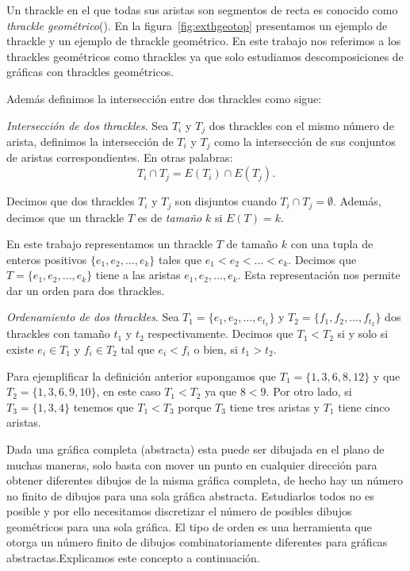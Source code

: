 Un thrackle en el que todas sus aristas son segmentos de recta es conocido como
\emph{thrackle geométrico}(\cite{Schaefer2018}). En la
figura~\ref{fig:exthgeotop} presentamos un ejemplo de thrackle y un ejemplo de
thrackle geométrico. En este trabajo nos referimos a los thrackles geométricos
como thrackles ya que solo estudiamos descomposiciones de gráficas con
thrackles geométricos.

Además definimos la intersección entre dos thrackles como sigue:

\begin{definition}{\emph{Intersección de dos thrackles}.} Sea $T_i$ y $T_j$ dos
  thrackles con el mismo número de arista, definimos la intersección de $T_i$ y
  $T_j$ como la intersección de sus conjuntos de aristas correspondientes. En
  otras palabras:
  \[ T_i \cap T_j = E(T_i) \cap E(T_j).\]
\end{definition}

Decimos que dos thrackles $T_i$ y $T_j$ son disjuntos cuando $T_i\cap T_j = \emptyset$. Además, decimos que
un thrackle $T$ es de \emph{tamaño} $k$ si $E(T)=k$.

En este trabajo representamos un thrackle $T$ de tamaño $k$ con una tupla de enteros positivos
$\{e_1,e_2,\dots,e_k\}$ tales que $e_1 < e_2 < \dots < e_k$. Decimos que $T=\{e_1,e_2,\dots,e_k\}$ tiene a
las aristas $e_1,e_2,\dots,e_k$. Esta representación nos permite dar un orden para dos thrackles.

\begin{definition}{\emph{Ordenamiento de dos thrackles}.}
  Sea $T_1 =\{e_1,e_2,\dots,e_{t_1}\}$ y $T_2 =\{f_1,f_2,\dots,f_{t_2}\}$ dos thrackles con tamaño $t_1$ y
  $t_2$ respectivamente. Decimos que $T_1 < T_2$ si y solo si existe $e_i \in T_1$ y $f_i \in T_2$ tal que
  $e_i < f_i$ o bien, si $t_1 > t_2$.
\end{definition}

Para ejemplificar la definición anterior supongamos que $T_1=\{1,3,6,8,12\}$ y que $T_2=\{1,3,6,9,10\}$, en
este caso $T_1 < T_2$ ya que $8 < 9$. Por otro lado, si $T_3=\{1,3,4\}$ tenemos que $T_1 < T_3$ porque
$T_3$ tiene tres aristas y $T_1$ tiene cinco aristas.

Dada una gráfica completa (abstracta) esta puede ser dibujada en el plano
de muchas maneras, solo basta con mover un punto en cualquier dirección
para obtener diferentes dibujos de la misma gráfica completa, de hecho
hay un número no finito de dibujos para una sola gráfica abstracta. Estudiarlos
todos no es posible y por ello necesitamos discretizar el número de
posibles dibujos geométricos para una sola gráfica. El tipo de orden es
una herramienta que otorga un número finito de dibujos combinatoriamente
diferentes para gráficas abstractas.Explicamos este concepto a continuación.

